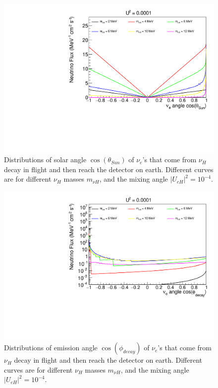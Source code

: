 \documentclass[%
 reprint,
 amsmath,amssymb,
 aps,
 prd,
floatfix,
twocolumn,
]{revtex4-1}
\begin{document}
\begin{figure}[!htbp]
\includegraphics[width=0.99\columnwidth]{../plots/DecayInFlightNuLCosthetaSun_U0.0001_AllMass_linXlinY.pdf}
\caption{Distributions of solar angle $\cos(\theta_{Sun})$ of $\nu_e$'s that come from $\nu_H$ decay in flight and then reach the detector on earth. Different curves are for different $\nu_H$ masses $m_{\nu H}$, and the mixing angle $|U_{eH}|^2 = 10^{-4}$.}
\label{fig:DecayInFlightTheta_U1em4_AllMass}
\end{figure}

\begin{figure}[!htbp]
\includegraphics[width=0.99\columnwidth]{../plots/DecayInFlightNuLCosphiSun_U0.0001_AllMass_linXlogY.pdf}
\caption{Distributions of emission angle $\cos(\phi_{decay})$ of $\nu_e$'s that come from $\nu_H$ decay in flight and then reach the detector on earth. Different curves are for different $\nu_H$ masses $m_{\nu H}$, and the mixing angle $|U_{eH}|^2 = 10^{-4}$.}
\label{fig:DecayInFlightPhi_U1em4_AllMass}
\end{figure}
\end{document}
